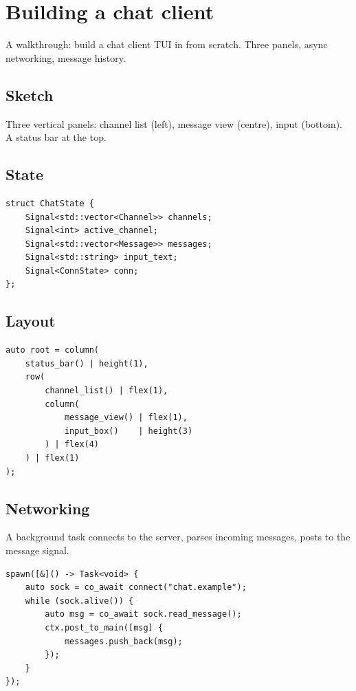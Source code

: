 \chapter{Building a chat client}
\label{ch:chatclient}

\begin{aside}
A walkthrough: build a chat client TUI in \maya{} from
scratch. Three panels, async networking, message history.
\end{aside}

\section{Sketch}

Three vertical panels: channel list (left), message view
(centre), input (bottom). A status bar at the top.

\section{State}

\begin{lstlisting}
struct ChatState {
    Signal<std::vector<Channel>> channels;
    Signal<int> active_channel;
    Signal<std::vector<Message>> messages;
    Signal<std::string> input_text;
    Signal<ConnState> conn;
};
\end{lstlisting}

\section{Layout}

\begin{lstlisting}
auto root = column(
    status_bar() | height(1),
    row(
        channel_list() | flex(1),
        column(
            message_view() | flex(1),
            input_box()    | height(3)
        ) | flex(4)
    ) | flex(1)
);
\end{lstlisting}

\section{Networking}

A background task connects to the server, parses incoming
messages, posts to the message signal.

\begin{lstlisting}
spawn([&]() -> Task<void> {
    auto sock = co_await connect("chat.example");
    while (sock.alive()) {
        auto msg = co_await sock.read_message();
        ctx.post_to_main([msg] {
            messages.push_back(msg);
        });
    }
});
\end{lstlisting}

